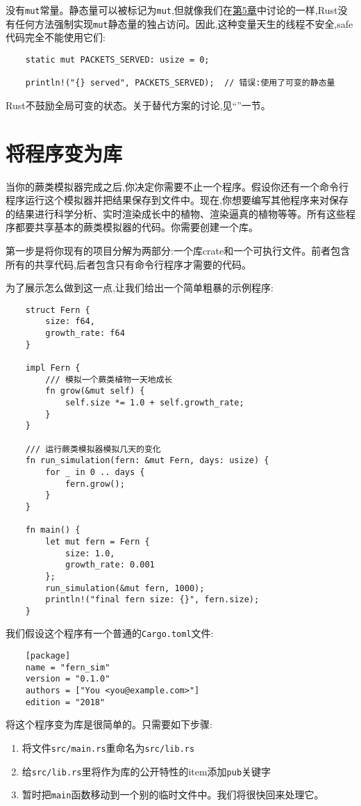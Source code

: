 没有\texttt{mut}常量。静态量可以被标记为\texttt{mut},但就像我们在\hyperref[ch05]{第5章}中讨论的一样,Rust没有任何方法强制实现\texttt{mut}静态量的独占访问。因此,这种变量天生的线程不安全,safe代码完全不能使用它们:
\begin{verbatim}
    static mut PACKETS_SERVED: usize = 0;

    println!("{} served", PACKETS_SERVED);  // 错误:使用了可变的静态量
\end{verbatim}

Rust不鼓励全局可变的状态。关于替代方案的讨论,见“”一节。

\section{将程序变为库}

当你的蕨类模拟器完成之后,你决定你需要不止一个程序。假设你还有一个命令行程序运行这个模拟器并把结果保存到文件中。现在,你想要编写其他程序来对保存的结果进行科学分析、实时渲染成长中的植物、渲染逼真的植物等等。所有这些程序都要共享基本的蕨类模拟器的代码。你需要创建一个库。

第一步是将你现有的项目分解为两部分:一个库crate和一个可执行文件。前者包含所有的共享代码,后者包含只有命令行程序才需要的代码。

为了展示怎么做到这一点,让我们给出一个简单粗暴的示例程序:
\begin{verbatim}
    struct Fern {
        size: f64,
        growth_rate: f64
    }

    impl Fern {
        /// 模拟一个蕨类植物一天地成长
        fn grow(&mut self) {
            self.size *= 1.0 + self.growth_rate;
        }
    }

    /// 运行蕨类模拟器模拟几天的变化
    fn run_simulation(fern: &mut Fern, days: usize) {
        for _ in 0 .. days {
            fern.grow();
        }
    }

    fn main() {
        let mut fern = Fern {
            size: 1.0,
            growth_rate: 0.001
        };
        run_simulation(&mut fern, 1000);
        println!("final fern size: {}", fern.size);
    }
\end{verbatim}

我们假设这个程序有一个普通的\texttt{Cargo.toml}文件:
\begin{verbatim}
    [package]
    name = "fern_sim"
    version = "0.1.0"
    authors = ["You <you@example.com>"]
    edition = "2018"
\end{verbatim}

将这个程序变为库是很简单的。只需要如下步骤:
\begin{enumerate}
    \item 将文件\texttt{src/main.rs}重命名为\texttt{src/lib.rs}
    \item 给\texttt{src/lib.rs}里将作为库的公开特性的item添加\texttt{pub}关键字
    \item 暂时把\texttt{main}函数移动到一个别的临时文件中。我们将很快回来处理它。
\end{enumerate}

